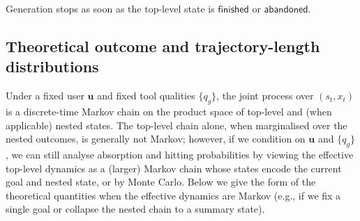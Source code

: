 Generation stops as soon as the top-level state is $\mathsf{finished}$ or $\mathsf{abandoned}$.

\subsection{Theoretical outcome and trajectory-length distributions}
\label{sec:method:theory}

Under a fixed user $\mathbf{u}$ and fixed tool qualities $\{q_g\}$, the joint process over $(s_t, x_t)$ is a discrete-time Markov chain on the product space of top-level and (when applicable) nested states. The top-level chain alone, when marginalised over the nested outcomes, is generally not Markov; however, if we condition on $\mathbf{u}$ and $\{q_g\}$, we can still analyse absorption and hitting probabilities by viewing the effective top-level dynamics as a (larger) Markov chain whose states encode the current goal and nested state, or by Monte Carlo. Below we give the form of the theoretical quantities when the effective dynamics are Markov (e.g., if we fix a single goal or collapse the nested chain to a summary state).


